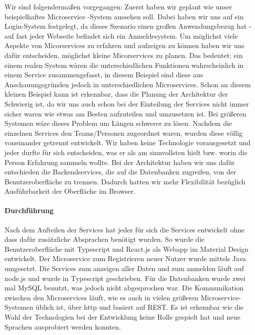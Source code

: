 Wir sind folgendermaßen vorgegangen: Zuerst haben wir geplant wie unser beispielhaftes Microservice -System aussehen soll. Dabei haben wir uns auf ein Login-System festgelegt, da dieses Szenario einen großen Anwendungsbezug hat - auf fast jeder Webseite befindet sich ein Anmeldesystem. \newline
Um möglichst viele Aspekte von Micorservices zu erfahren und aufzeigen zu können haben wir uns dafür entscheiden, möglichst kleine Micorservices zu planen. Das bedeutet: ein einem realen System wären die unterschiedlichen Funktionen wahrscheinlich in einem Service zusammengefasst, in diesem Beispiel sind diese aus Anschauungsgründen jedoch in unterschiedlichen Microservices. \newline
Schon an diesem kleinen Beispiel kann ist erkennbar, dass die Planung der Architektur der Schwierig ist, da wir uns auch schon bei der Einteilung der Services nicht immer sicher waren wie etwas am Besten aufzuteilen und umzusetzen ist. Bei größeren Systemen wäre dieses Problem um Längen schwerer zu lösen. \newline
Nachdem die einzelnen Services den Teams/Personen  zugeordnet waren, wurden diese völlig voneinander getrennt entwickelt. Wir haben keine Technologie vorausgesetzt und jeder durfte für sich entscheiden, was er als am sinnvollsten hielt bzw. worin die Person Erfahrung sammeln wollte. \newline
Bei der Architektur haben wir uns dafür entschieden die Backendservices, die auf die Datenbanken zugreifen, von der Benutzeroberfläche zu trennen. Dadurch hatten wir mehr Flexibilität bezüglich Ausführbarkeit der Oberfläche im Browser.

\paragraph{Durchführung}
Nach dem Aufteilen der Services hat jeder für sich die Services entwickelt ohne dass dafür zusätzliche Absprachen benötigt wurden. So wurde die Benutzeroberfläche mit Typescript und React.js als Webapp im Material Design entwickelt. Der Microservice zum Registrieren neuer Nutzer wurde mittels Java umgesetzt. Die Services zum anzeigen aller Daten und zum anmelden läuft auf node.js und wurde in Typescript geschrieben. Für die Datenbanken wurde zwei mal MySQL benutzt, was jedoch nicht abgesprochen war. Die Kommunikation zwischen den Microservices läuft, wie es auch in vielen größeren Microservice-Systemen üblich ist, über http und basiert auf REST. \newline
Es ist erkennbar wie die Wahl der Technologien bei der Entwicklung keine Rolle gespielt hat und neue Sprachen ausprobiert werden konnten.

